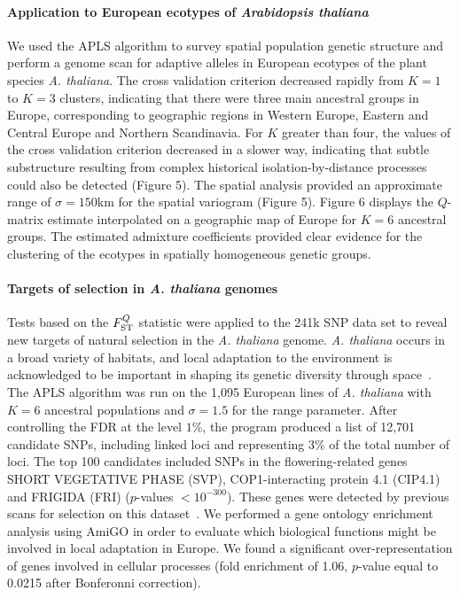  
\paragraph{Application to European ecotypes of {\it Arabidopsis  thaliana}} We used  the APLS algorithm to survey spatial population genetic structure and perform a genome scan for adaptive alleles in European ecotypes of the plant species {\it A.  thaliana}. The cross validation criterion decreased rapidly from $K=1$ to $K=3$ clusters,  indicating  that  there were three main ancestral groups in Europe, corresponding to geographic regions in Western Europe, Eastern and Central Europe and Northern Scandinavia. For $K$ greater than four, the values of the cross validation criterion decreased in a slower way, indicating that subtle substructure resulting from complex historical isolation-by-distance  processes could also be detected (Figure 5). The spatial analysis provided an approximate range of  $\sigma = 150$km for the spatial variogram (Figure 5). Figure 6 displays the $Q$-matrix estimate  interpolated on a geographic map of Europe for $K = 6$ ancestral groups. The estimated admixture coefficients provided clear evidence for the clustering of the ecotypes in spatially homogeneous genetic groups. 

\paragraph{Targets of selection in {\it A.  thaliana} genomes}  Tests based on the $F^Q_{\rm ST}$  statistic were applied to the 241k SNP data set to reveal new targets of natural selection in the {\it A. thaliana} genome. {\it A. thaliana} occurs in a broad variety of habitats, and local adaptation to the environment is acknowledged to be important in shaping its genetic diversity through space~\citep{Hancock2011, Fournier-Level2011}. 
The APLS algorithm was run on the 1,095 European lines of {\it A. thaliana} with $K=6$ ancestral populations and $\sigma = 1.5$ for the range parameter. After controlling the FDR at the level $1\%$, the program produced a list of 12,701 candidate SNPs, including linked loci and representing 3\% of the total number of loci. 
 The top 100 candidates included SNPs in the flowering-related genes SHORT VEGETATIVE PHASE (SVP), COP1-interacting protein 4.1 (CIP4.1) and FRIGIDA (FRI) ($p$-values $< 10^{-300}$). These genes were detected by previous scans for selection on this dataset~\citep{Horton2012}.
 We performed a gene ontology enrichment analysis using AmiGO in order to evaluate which biological functions might be involved in local adaptation in Europe. 
 We found a significant over-representation of genes involved in cellular processes (fold enrichment of 1.06, $p$-value equal to 0.0215 after Bonferonni correction).


